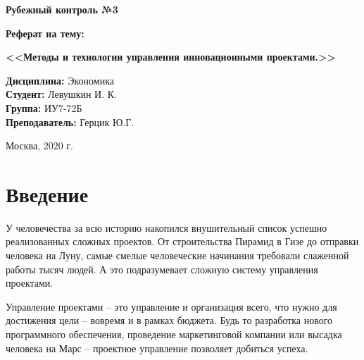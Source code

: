\documentclass[a4paper,14pt]{extarticle}
\begin{document}
 	\LARGE
 	\begin{center}
 		\textbf{Рубежный контроль №3}
 		
 		\textbf{Реферат на тему:}
 		
 		\textbf{<<Методы и технологии управления инновационными проектами.>>}
 	\end{center}
 	
 	
 	\vspace*{15mm}
 	
 	\large
 	\begin{flushleft}
 		\textbf{Дисциплина:} Экономика \\
 		\textbf{Студент:} Левушкин И. К. \\
 		\textbf{Группа:} ИУ7-72Б \\
 		\textbf{Преподаватель:} Герцик Ю.Г.\\
 	\end{flushleft}
 	
 	\vspace*{50mm}
 	
 	\large
 	\begin{center}
 		Москва, 2020 г.
 	\end{center}
 	
 	\thispagestyle{empty}
 	
 	\newpage
 	
 	\tableofcontents
 	\newpage
 	\section*{Введение}
 	
 	У человечества за всю историю накопился внушительный список успешно реализованных сложных проектов. От строительства Пирамид в Гизе до отправки человека на Луну, самые смелые человеческие начинания требовали слаженной работы тысяч людей. А это подразумевает сложную систему управления проектами.
 	
 	Управление проектами – это управление и организация всего, что нужно для достижения цели – вовремя и в рамках бюджета. Будь то разработка нового программного обеспечения, проведение маркетинговой компании или высадка человека на Марс – проектное управление позволяет добиться успеха.
 	
\end{document}
